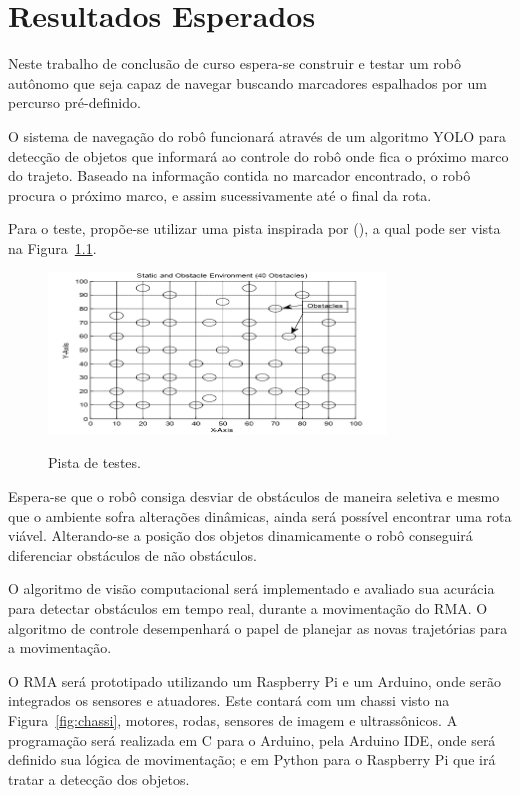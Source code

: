 \chapter{Resultados Esperados}
\label{chap:ResultadosEsperados}

Neste trabalho de conclusão de curso espera-se construir e testar um robô autônomo que seja capaz de navegar buscando marcadores espalhados por um percurso pré-definido. 

O sistema de navegação do robô funcionará através de um algoritmo YOLO para detecção de objetos que informará ao controle do robô onde fica o próximo marco do trajeto. Baseado na informação contida no marcador encontrado, o robô procura o próximo marco, e assim sucessivamente até o final da rota.

Para o teste, propõe-se utilizar uma pista inspirada por \citeauthor{memon2015autonomous} (\citeyear{memon2015autonomous}), a qual pode ser vista na Figura~\ref{fig:pista-testes}.

\begin{figure}[!hbtp]
  \centering
   \caption{Pista de testes.}
    \includegraphics[width = 0.8\textwidth]{Caps/Figs/resultados/pista.png}
   \label{fig:pista-testes}
\end{figure}

Espera-se que o robô consiga desviar de obstáculos de maneira seletiva e mesmo que o ambiente sofra alterações dinâmicas, ainda será possível encontrar uma rota viável. Alterando-se a posição dos objetos dinamicamente o robô conseguirá diferenciar obstáculos de não obstáculos.

O algoritmo de visão computacional será implementado e avaliado sua acurácia para detectar obstáculos em tempo real, durante a movimentação do RMA. O algoritmo de controle desempenhará o papel de planejar as novas trajetórias para a movimentação.

O RMA será prototipado utilizando um Raspberry Pi e um Arduino, onde serão integrados os sensores e atuadores. Este contará com um chassi visto na Figura~\ref{fig:chassi}, motores, rodas, sensores de imagem e ultrassônicos. A programação será realizada em C para o Arduino, pela Arduino IDE, onde será definido sua lógica de movimentação; e em Python para o Raspberry Pi que irá tratar a detecção dos objetos.

